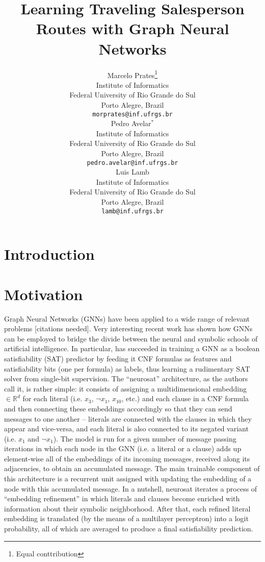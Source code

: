 \documentclass{article}
\title{Learning Traveling Salesperson Routes with Graph Neural Networks}
\author{
  Marcelo Prates\thanks{Equal conttribution} \\
  Institute of Informatics\\
  Federal University of Rio Grande do Sul\\
  Porto Alegre, Brazil \\
  \texttt{morprates@inf.ufrgs.br} \\
  \And
  Pedro Avelar{$^*$} \\
  Institute of Informatics\\
  Federal University of Rio Grande do Sul\\
  Porto Alegre, Brazil \\
  \texttt{pedro.avelar@inf.ufrgs.br} \\
  \And
  Luis Lamb \\
  Institute of Informatics\\
  Federal University of Rio Grande do Sul\\
  Porto Alegre, Brazil \\
  \texttt{lamb@inf.ufrgs.br} \\
  }
\begin{document}
\maketitle

\begin{abstract}
\end{abstract}

\section{Introduction}

\section{Motivation}

Graph Neural Networks (GNNs) have been applied to a wide range of relevant problems [citations needed]. Very interesting recent work has shown how GNNs can be employed to bridge the divide between the neural and symbolic schools of artificial intelligence. In particular, \cite{selsam2018learning} has succeeded in training a GNN as a boolean satisfiability (SAT) predictor by feeding it CNF formulas as features and satisfiability bits (one per formula) as labels, thus learning a rudimentary SAT solver from single-bit supervision. The ``neurosat'' architecture, as the authors call it, is rather simple: it consists of assigning a multidimensional embedding $\in \mathbb{R}^d$ for each literal (i.e. $x_3$, $\neg x_1$, $x_{10}$, etc.) and each clause in a CNF formula and then connecting these embeddings accordingly so that they can send messages to one another -- literals are connected with the clauses in which they appear and vice-versa, and each literal is also connected to its negated variant (i.e. $x_1$ and $\neg x_1$). The model is run for a given number of message passing iterations in which each node in the GNN (i.e. a literal or a clause) adds up element-wise all of the embeddings of its incoming messages, received along its adjacencies, to obtain an accumulated message. The main trainable component of this architecture is a recurrent unit assigned with updating the embedding of a node with this accumulated message. In a nutshell, neurosat iterates a process of ``embedding refinement'' in which literals and clauses become enriched with information about their symbolic neighborhood. After that, each refined literal embedding is translated (by the means of a multilayer perceptron) into a logit probability, all of which are averaged to produce a final satisfiability prediction.
\end{document}
